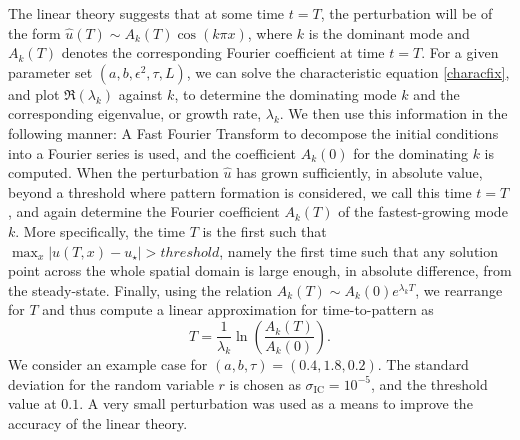 The linear theory suggests that at some time $t=T$, the perturbation will be of the form $\hat{u}(T)\sim A_k(T)\cos(k\pi x)$, where $k$ is the dominant mode and $A_k(T)$ denotes the corresponding Fourier coefficient at time $t=T$. For a given parameter set $(a,b,\epsilon^2,\tau,L)$, we can solve the characteristic equation \eqref{characfix}, and plot $\Re(\lambda_k)$
against $k$, to determine the dominating mode $k$ and the corresponding eigenvalue, or growth rate, $\lambda_k$. We then use this information in the following manner: A Fast Fourier Transform to decompose the initial conditions into a Fourier series is used, and the coefficient $A_k(0)$ for the dominating $k$ is computed. When the perturbation $\hat{u}$ has grown sufficiently, in absolute value, beyond a threshold where pattern formation is considered, we call this time $t=T$, and again determine the Fourier coefficient $A_k(T)$ of the fastest-growing mode $k$. More specifically, the time $T$ is the first such that $\max_x|u(T,x)-u_\star|>threshold$, namely the first time such that any solution point across the whole spatial domain is large enough, in absolute difference, from the steady-state. Finally, using the relation $A_k(T)\sim A_k(0)e^{\lambda_k T}$, we rearrange for $T$ and thus compute a linear approximation for time-to-pattern as
\begin{equation}\label{ttprelation}
    T=\frac{1}{\lambda_k}\ln\left(\frac{A_k(T)}{A_k(0)}\right).
\end{equation}
We consider an example case for $(a,b,\tau)=(0.4,1.8,0.2)$. The standard deviation for the random variable $r$ is chosen as $\sigma_{\text{IC}}=10^{-5}$, and the threshold value at $0.1$. A very small perturbation was used as a means to improve the accuracy of the linear theory.

